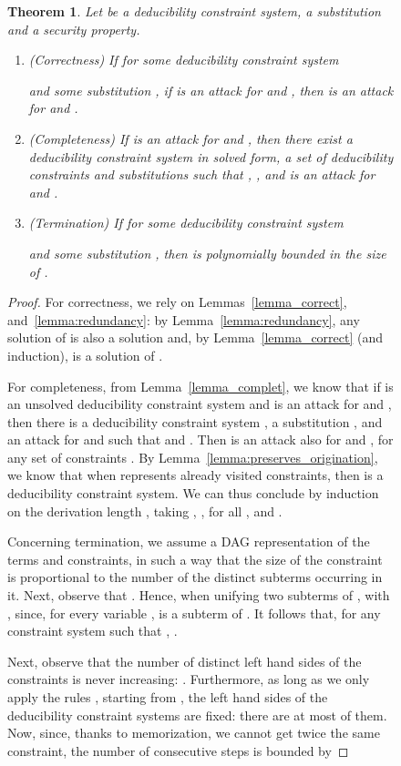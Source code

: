 \documentclass[acmtocl,acmnow]{acmtrans2m}
\newtheorem{theorem}{Theorem}[section]
\newcommand{\dedsys}[1]{deducibility constraint system}
\newcommand{\dedconss}[1]{deducibility constraints}
\newcommand{\dedsyss}[1]{deducibility constraint systems}
\begin{document}
\begin{figure}[t]
{{\begin{theorem}\label{theo:general_NP}
Let  be a \dedsys{},  a substitution and   a security property. \begin{enumerate}
\item(Correctness)
If  for some \dedsys{}

and some substitution , if  is an attack  for  and ,
then  is an attack for  and .\item(Completeness) If  is an attack for   and ,
then there exist a \dedsys{}  in solved
  form, a set of \dedconss{} 
  and  substitutions  such that , , and  is an
attack for   and .
\item(Termination) If  for some
\dedsys{}

and some substitution , then  is polynomially bounded in
the size of .
\end{enumerate}
\end{theorem}

\begin{proof}
For correctness, we rely on Lemmas~\ref{lemma_correct},
and~\ref{lemma:redundancy}: by Lemma~\ref{lemma:redundancy}, any solution   of  
is also a solution  and, by Lemma~\ref{lemma_correct} (and induction),
 is a solution of . 

For completeness, 
from Lemma~\ref{lemma_complet}, we know that
if  is an unsolved \dedsys{} and  is an attack
for  and , then there is a \dedsys{} , a substitution ,
and an attack  for  and  such that  and .
Then  is an attack also for  and
, for any set of constraints . By
Lemma~\ref{lemma:preserves_origination}, we know that when 
represents already visited constraints, then 
is a \dedsys{}. We can thus conclude by induction on the derivation
length , taking , ,  for all , and .





Concerning termination, we assume a DAG representation of
the terms and constraints, in such a way that the size of the constraint
is proportional to the number of the distinct subterms occurring in it.
Next, observe that . Hence, when unifying two subterms of , with
 ,
 since, for every variable ,  is a subterm of . It follows that, for any constraint system
 such that , . 

Next, observe that the number of distinct left hand sides of the constraints
 is never increasing: .
Furthermore, as long as we only apply the rules , starting from ,
 the 
left hand sides of the \dedsyss{} are fixed: there are at most
 of them. 
Now, since, thanks to memorization, we cannot get twice the same
constraint, the number of consecutive  steps is bounded by



\end{proof}}}
\end{figure}
\end{document}
